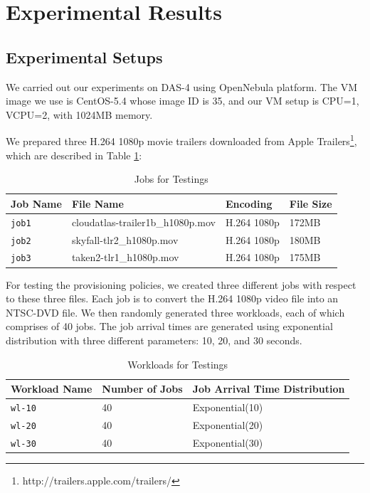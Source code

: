 \section{Experimental Results}

\subsection{Experimental Setups}
We carried out our experiments on DAS-4 using OpenNebula platform. The VM image we use is CentOS-5.4 whose image ID is 35, and our VM setup is CPU=1, VCPU=2, with 1024MB memory.

We prepared three H.264 1080p movie trailers downloaded from Apple Trailers\footnote{http://trailers.apple.com/trailers/}, which are described in Table \ref{table_joblist}:

\begin{table}[!t]
\caption{Jobs for Testings}
\label{table_joblist}
\centering
\begin{tabular}{|l|l|l|l|}
\hline
Job Name & File Name & Encoding & File Size\\
\hline
\texttt{job1} & cloudatlas-trailer1b\_h1080p.mov & H.264 1080p & 172MB \\
\hline
\texttt{job2} & skyfall-tlr2\_h1080p.mov & H.264 1080p & 180MB \\
\hline
\texttt{job3} & taken2-tlr1\_h1080p.mov & H.264 1080p & 175MB \\
\hline
\end{tabular}
\end{table}

For testing the provisioning policies, we created three different jobs with respect to these three files. Each job is to convert the H.264 1080p video file into an NTSC-DVD file. We then randomly generated three workloads, each of which comprises of 40 jobs. The job arrival times are generated using exponential distribution with three different parameters: 10, 20, and 30 seconds.

\begin{table}[!t]
\caption{Workloads for Testings}
\label{table_workloadlist}
\centering
\begin{tabular}{|l|l|l|}
\hline
Workload Name & Number of Jobs & Job Arrival Time Distribution \\
\hline
\texttt{wl-10} & 40 & Exponential(10) \\
\hline
\texttt{wl-20} & 40 & Exponential(20) \\
\hline
\texttt{wl-30} & 40 & Exponential(30) \\
\hline
\end{tabular}
\end{table}


